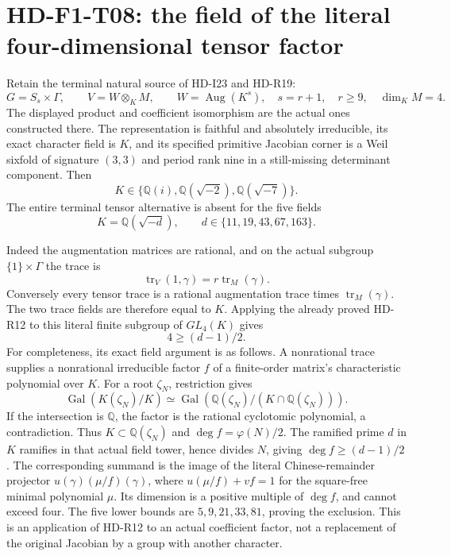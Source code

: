 \section{HD-F1-T08: the field of the literal four-dimensional tensor factor}
\label{sec:f1-terminal-tensor-field}

Retain the terminal natural source of HD-I23 and HD-R19:
\[
 G=S_s\times\Gamma,\qquad
 V=W\otimes_K M,\qquad W=\operatorname{Aug}(K^s),\quad
 s=r+1,\quad r\ge9,\quad\dim_K M=4.
 \tag{F1T8.1}
\]
The displayed product and coefficient isomorphism are the actual
ones constructed there. The representation is faithful and absolutely
irreducible, its exact character field is \(K\), and its specified
primitive Jacobian corner is a Weil sixfold of signature \((3,3)\)
and period rank nine in a still-missing determinant component.
Then
\[
                  K\in\{\mathbb Q(i),\mathbb Q(\sqrt{-2}),
                                     \mathbb Q(\sqrt{-7})\}.
 \tag{F1T8.2}
\]
The entire terminal tensor alternative is absent for the five fields
\[
 K=\mathbb Q(\sqrt{-d}),\qquad d\in\{11,19,43,67,163\}.
\]

Indeed the augmentation matrices are rational, and on the actual
subgroup \(\{1\}\times\Gamma\) the trace is
\[
          \operatorname{tr}_V(1,\gamma)=r\operatorname{tr}_M(\gamma).
 \tag{F1T8.3}
\]
Conversely every tensor trace is a rational augmentation trace
times \(\operatorname{tr}_M(\gamma)\). The two trace fields are
therefore equal to \(K\). Applying the already proved HD-R12 to
this literal finite subgroup of \(GL_4(K)\) gives
\[
             4\ge (d-1)/2.
 \tag{F1T8.4}
\]
For completeness, its exact field argument is as follows. A
nonrational trace supplies a nonrational irreducible factor \(f\)
of a finite-order matrix's characteristic polynomial over \(K\).
For a root \(\zeta_N\), restriction gives
\[
 \operatorname{Gal}(K(\zeta_N)/K)
   \simeq\operatorname{Gal}(\mathbb Q(\zeta_N)/
                              (K\cap\mathbb Q(\zeta_N))).
\]
If the intersection is \(\mathbb Q\), the factor is the rational
cyclotomic polynomial, a contradiction. Thus
\(K\subset\mathbb Q(\zeta_N)\) and \(\deg f=\varphi(N)/2\).
The ramified prime \(d\) in \(K\) ramifies in that actual field
tower, hence divides \(N\), giving \(\deg f\ge(d-1)/2\).
The corresponding summand is the image of the literal
Chinese-remainder projector \(u(\gamma)(\mu/f)(\gamma)\),
where \(u(\mu/f)+vf=1\) for the square-free minimal polynomial
\(\mu\). Its dimension is a positive multiple of \(\deg f\),
and cannot exceed four. The five lower bounds are
\(5,9,21,33,81\), proving the exclusion. This is an application
of HD-R12 to an actual coefficient factor, not a replacement
of the original Jacobian by a group with another character.

